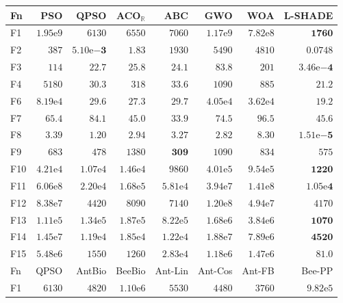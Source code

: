 \begin{tabular}{lrrrrrrr}
\toprule
Fn & PSO & QPSO & ACO$_\mathbb{R}$ & ABC & GWO & WOA & L-SHADE \\
\midrule
F1 & $1.95\mathrm{e}{9}$ & $6130$ & $6550$ & $7060$ & $1.17\mathrm{e}{9}$ & $7.82\mathrm{e}{8}$ & $\mathbf{1760}$ \\
F2 & $387$ & $\mathbf{5.10\mathrm{e}{-3}}$ & $1.83$ & $1930$ & $5490$ & $4810$ & $0.0748$ \\
F3 & $114$ & $22.7$ & $25.8$ & $24.1$ & $83.8$ & $201$ & $\mathbf{3.46\mathrm{e}{-4}}$ \\
F4 & $5180$ & $30.3$ & $318$ & $33.6$ & $1090$ & $885$ & $\mathbf{21.2}$ \\
F6 & $8.19\mathrm{e}{4}$ & $29.6$ & $27.3$ & $29.7$ & $4.05\mathrm{e}{4}$ & $3.62\mathrm{e}{4}$ & $\mathbf{19.2}$ \\
F7 & $65.4$ & $84.1$ & $45.0$ & $\mathbf{33.9}$ & $74.5$ & $96.5$ & $45.6$ \\
F8 & $3.39$ & $1.20$ & $2.94$ & $3.27$ & $2.82$ & $8.30$ & $\mathbf{1.51\mathrm{e}{-5}}$ \\
F9 & $683$ & $478$ & $1380$ & $\mathbf{309}$ & $1090$ & $834$ & $575$ \\
F10 & $4.21\mathrm{e}{4}$ & $1.07\mathrm{e}{4}$ & $1.46\mathrm{e}{4}$ & $9860$ & $4.01\mathrm{e}{5}$ & $9.54\mathrm{e}{5}$ & $\mathbf{1220}$ \\
F11 & $6.06\mathrm{e}{8}$ & $2.20\mathrm{e}{4}$ & $1.68\mathrm{e}{5}$ & $5.81\mathrm{e}{4}$ & $3.94\mathrm{e}{7}$ & $1.41\mathrm{e}{8}$ & $\mathbf{1.05\mathrm{e}{4}}$ \\
F12 & $8.38\mathrm{e}{7}$ & $4420$ & $8090$ & $7140$ & $1.20\mathrm{e}{8}$ & $4.94\mathrm{e}{7}$ & $4170$ \\
F13 & $1.11\mathrm{e}{5}$ & $1.34\mathrm{e}{5}$ & $1.87\mathrm{e}{5}$ & $8.22\mathrm{e}{5}$ & $1.68\mathrm{e}{6}$ & $3.84\mathrm{e}{6}$ & $\mathbf{1070}$ \\
F14 & $1.45\mathrm{e}{7}$ & $1.19\mathrm{e}{4}$ & $1.85\mathrm{e}{4}$ & $1.22\mathrm{e}{4}$ & $1.88\mathrm{e}{7}$ & $7.89\mathrm{e}{6}$ & $\mathbf{4520}$ \\
F15 & $5.48\mathrm{e}{6}$ & $1550$ & $1260$ & $2.83\mathrm{e}{4}$ & $1.18\mathrm{e}{6}$ & $1.47\mathrm{e}{6}$ & $\mathbf{81.0}$ \\
\midrule
Fn & QPSO & AntBio & BeeBio & Ant-Lin & Ant-Cos & Ant-FB & Bee-PP \\
\midrule
F1 & $6130$ & $4820$ & $1.10\mathrm{e}{6}$ & $5530$ & $4480$ & $3760$ & $9.82\mathrm{e}{5}$ \\

\end{tabular}
